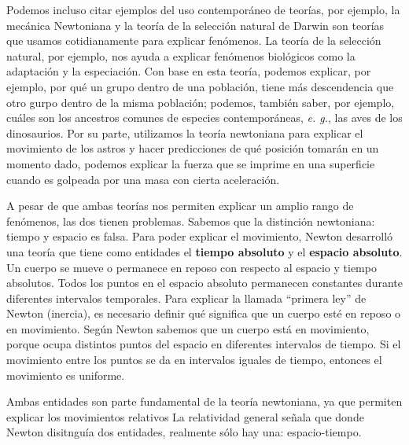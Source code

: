 \documentclass[12pt]{article}
\begin{document}
Podemos incluso citar ejemplos del uso contemporáneo de teorías, por ejemplo, la mecánica Newtoniana y la teoría de la selección natural de Darwin son teorías que usamos cotidianamente para explicar fenómenos. La teoría de la selección natural, por ejemplo, nos ayuda a explicar fenómenos biológicos como la adaptación y la especiación. Con base en esta teoría, podemos explicar, por ejemplo, por qué un grupo dentro de una población, tiene más descendencia que otro gurpo dentro de la misma población; podemos, también saber, por ejemplo, cuáles son los ancestros comunes de especies contemporáneas, \textit{e. g.}, las aves de los dinosaurios. Por su parte, utilizamos la teoría newtoniana para explicar el movimiento de los astros y hacer predicciones de qué posición tomarán en un momento dado, podemos explicar la fuerza que se imprime en una superficie cuando es golpeada por una masa con cierta aceleración.

A pesar de que ambas teorías nos permiten explicar un amplio rango de fenómenos, las dos tienen problemas. Sabemos que la distinción newtoniana: tiempo y espacio es falsa. Para poder explicar el movimiento, Newton desarrolló una teoría que tiene como entidades el \textbf{tiempo absoluto} y el \textbf{espacio absoluto}. Un cuerpo se mueve o permanece en reposo con respecto al espacio y tiempo absolutos. Todos los puntos en el espacio absoluto permanecen constantes durante diferentes intervalos temporales. Para explicar la llamada ``primera ley''  de Newton (inercia), es necesario definir qué significa que un cuerpo esté en reposo o en movimiento. Según Newton sabemos que un cuerpo está en movimiento, porque ocupa distintos puntos del espacio en diferentes intervalos de tiempo. Si el movimiento entre los puntos se da en intervalos iguales de tiempo, entonces el movimiento es uniforme. 


Ambas entidades son parte fundamental de la teoría newtoniana, ya que permiten explicar los movimientos relativos \cite{Maudlin2014Filosofia:7985} La relatividad general señala que donde Newton disitnguía dos entidades, realmente sólo hay una: espacio-tiempo. 







\end{document}
